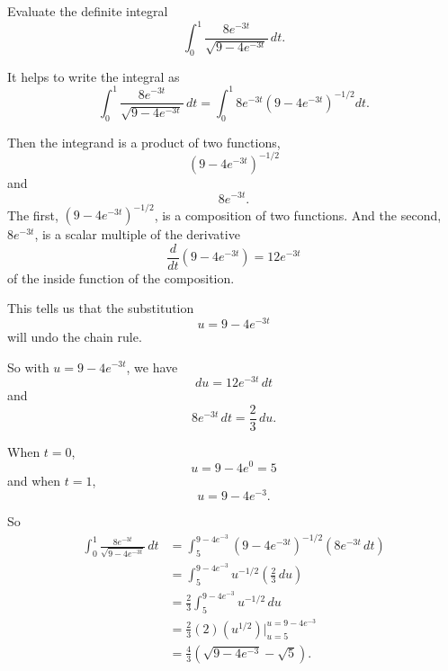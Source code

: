 \documentclass{ximera}
\begin{document}
\begin{question}  \label{Q9ierER3P}
\item Evaluate the definite integral
\[
      \int_0^1 \frac{8e^{-3t}}{\sqrt{9-4e^{-3t}}}\, dt .
\]

\begin{explanation}
It helps to write the integral as
\[
  \int_0^1 \frac{8e^{-3t}}{\sqrt{9-4e^{-3t}}}\, dt =  \int_0^1  8e^{-3t} \left(  9-4e^{-3t}\right)^{-1/2} dt .
\]

Then the integrand is a product of two functions,
\[
        \left(  9-4e^{-3t}\right)^{-1/2}
\]
and
\[
    8e^{-3t} .
\]
The first, $(  9-4e^{-3t})^{-1/2}$, is a composition of two functions. And the second, $8e^{-3t}$, is a scalar multiple of the derivative
\[
 \frac{d}{dt}\left(  9-4e^{-3t}  \right) = 12e^{-3t}
\]
of the inside function of the composition.

This tells us that the substitution
\[
 u =  9-4e^{-3t}
\]
will undo the chain rule.

So with $u= 9-4e^{-3t}$,  we have
\[
    du = 12e^{-3t} \, dt
\]
and 
\[
     8 e^{-3t}\, dt = \frac{2}{3} \, du.
\]

When $t=0$,
\[
      u = 9-4e^0 = 5
\]
and when $t=1$,
\[
     u = 9-4e^{-3}.
\]

So
\begin{align*}
\int_0^1 \frac{8e^{-3t}}{\sqrt{9-4e^{-3t}}}\, dt  &= \int_5^{ 9-4e^{-3}} ( 9-4e^{-3t})^{-1/2} (8e^{-3t} \, dt)  \\
                                                  &= \int_5^{ 9-4e^{-3}} u^{-1/2} \left(  \frac{2}{3}\, du \right) \\
                                                  &= \frac{2}{3}\int_5^{ 9-4e^{-3}} u^{-1/2} \, du \\
                                                  & = \frac{2}{3}(2)(u^{1/2}) \Big|_{u=5}^{u=9-4e^{-3}} \\
                                                  &=\frac{4}{3} \left( \sqrt{9-4e^{-3}} - \sqrt{5} \right). \\
\end{align*}

\end{explanation}



\end{question}
\end{document}
